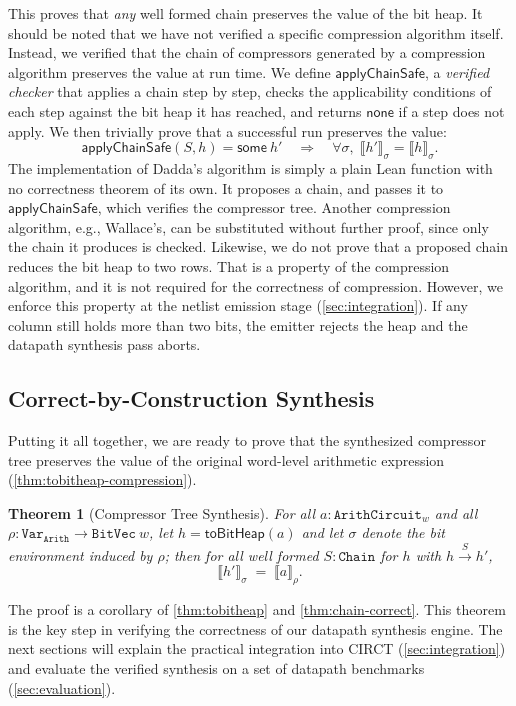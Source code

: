 \documentclass[conference]{IEEEtran}
\newcommand{\bvsem}[1]{\llbracket #1 \rrbracket_{\rho}}
\newcommand{\hsem}[1]{\llbracket #1 \rrbracket_{\sigma}}
\newcommand{\Chain}{\ensuremath{\texttt{Chain}}\xspace}
\theoremstyle{plain}
\newtheorem{theorem}{Theorem}
\theoremstyle{definition}
\begin{document}
This proves that \emph{any} well formed chain preserves the value of the bit heap.
It should be noted that we have not verified a specific compression algorithm itself.
Instead, we verified that the chain of compressors generated by a compression algorithm preserves the value at run time.
We define $\mathsf{applyChainSafe}$, a \emph{verified checker} that applies a chain step by step, checks the applicability conditions of each step against the bit heap it
has reached, and returns $\mathsf{none}$ if a step does not apply.
We then trivially prove that a successful run preserves the value:
\[
  \mathsf{applyChainSafe}(S, h) = \mathsf{some}\ h'
  \quad\Longrightarrow\quad
  \forall \sigma,\; \hsem{h'} = \hsem{h}.
\]
The implementation of Dadda's algorithm is simply a plain Lean function with no correctness theorem of its own.
It proposes a chain, and passes it to $\mathsf{applyChainSafe}$, which verifies the compressor tree.
Another compression algorithm, e.g., Wallace's, can be substituted without further proof, since only the chain it produces is checked.
Likewise, we do not prove that a proposed chain reduces the bit heap to two rows.
That is a property of the compression algorithm, and it is not required for the correctness of compression.
However, we enforce this property at the netlist emission stage (\autoref{sec:integration}).
If any column still holds more than two bits, the emitter rejects the heap and the datapath synthesis pass aborts.

\subsection{Correct-by-Construction Synthesis}
Putting it all together, we are ready to prove that the synthesized compressor tree
preserves the value of the original word-level arithmetic expression (\autoref{thm:tobitheap-compression}).
\begin{theorem}[Compressor Tree Synthesis]
\label{thm:tobitheap-compression}
For all $a : \mathtt{ArithCircuit}_w$ and all $\rho : \texttt{Var}_{\texttt{Arith}} \to
\mathtt{BitVec}\ w$, let $h = \mathsf{toBitHeap}(a)$ and let $\sigma$ denote the bit
environment induced by $\rho$; then for all well formed $S : \Chain$ for $h$
with $h \xrightarrow{S} h'$,
\[
  \hsem{h'} \;=\; \bvsem{a}.
\]
\end{theorem}
The proof is a corollary of \autoref{thm:tobitheap} and \autoref{thm:chain-correct}.
This theorem is the key step in verifying the correctness of our datapath synthesis engine.
The next sections will explain the practical integration into CIRCT (\autoref{sec:integration}) 
and evaluate the verified synthesis on a set of datapath benchmarks (\autoref{sec:evaluation}).
\end{document}
